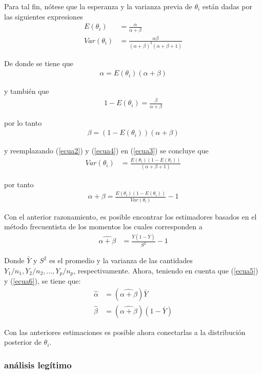 \documentclass[10pt,openright]{book}\usepackage[]{graphicx}\usepackage[]{color}
\begin{document}
Para tal fin, n\'otese que la esperanza y la varianza previa de $\theta_i$ est\'an dadas por las siguientes expresiones
\begin{align}
E(\theta_i)&=\frac{\alpha}{\alpha+\beta}\label{ecua2}\\
Var(\theta_i)&=\frac{\alpha\beta}{(\alpha+\beta)^2(\alpha+\beta+1)}\label{ecua3}
\end{align}

De donde se tiene que
\begin{align}\label{ecua5}
\alpha=E(\theta_i)(\alpha+\beta)
\end{align}

y tambi\'en que
\begin{align}\label{ecua4}
1-E(\theta_i)=\frac{\beta}{\alpha+\beta}
\end{align}

por lo tanto
\begin{align}\label{ecua6}
\beta=(1-E(\theta_i))(\alpha+\beta)
\end{align}

y reemplazando (\ref{ecua2}) y (\ref{ecua4}) en (\ref{ecua3}) se concluye que
\begin{align*}
Var(\theta_i)&=\frac{E(\theta_i)(1-E(\theta_i))}{(\alpha+\beta+1)}
\end{align*}

por tanto
\begin{align}
\alpha+\beta=\frac{E(\theta_i)(1-E(\theta_i))}{Var(\theta_i)}-1
\end{align}

Con el anterior razonamiento, es posible encontrar los estimadores basados en el m\'etodo frecuentista de los momentos los cuales corresponden a
\begin{align}
\widehat{\alpha+\beta}&=\frac{\bar{Y}(1-\bar{Y})}{S^2}-1
\end{align}

Donde $\bar{Y}$ y $S^2$ es el promedio y la varianza de las cantidades $Y_1/n_1, Y_2/n_2,\ldots, Y_p/n_p$, respectivamente. Ahora, teniendo en cuenta que (\ref{ecua5}) y (\ref{ecua6}), se tiene que:
\begin{align}
\hat{\alpha}&=(\widehat{\alpha+\beta})\bar{Y}\\
\hat{\beta}&=(\widehat{\alpha+\beta})(1-\bar{Y})
\end{align}

 Con las anteriores estimaciones es posible ahora conectarlas a la distribuci\'on posterior de $\theta_i$.

\subsubsection{an\'alisis leg\'itimo}
\end{document}
